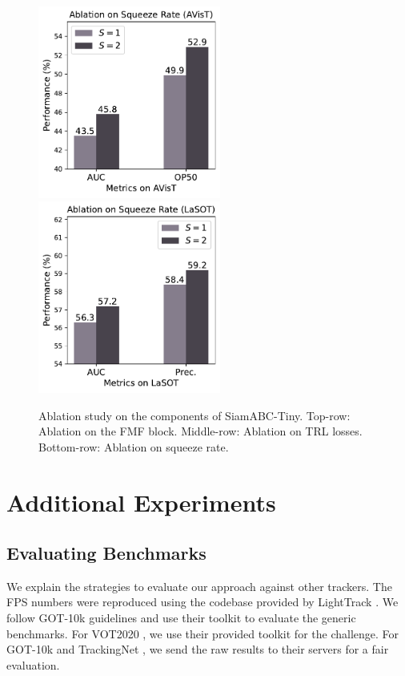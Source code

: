 \begin{figure}[t]
	 \includegraphics[width=6cm]{figures/abl_sr_avist.pdf}
	 \includegraphics[width=6cm]{figures/abl_sr_lasot.pdf}
	 \vspace{-4mm}
	 \caption{Ablation study on the components of SiamABC-Tiny. Top-row: Ablation on the FMF block. Middle-row: Ablation on TRL losses. Bottom-row: Ablation on squeeze rate.}
	 \label{fig:all_ablation}
	 \vspace{-5mm}
   \end{figure}


   \section{Additional Experiments}


\subsection{Evaluating Benchmarks}
We explain the strategies to evaluate our approach against other trackers. The FPS numbers were reproduced using the codebase provided by LightTrack \cite{yan2021lighttrack}. We follow GOT-10k\cite{Huang2021} guidelines and use their toolkit \cite{githubGitHubGot10ktoolkit} to evaluate the generic benchmarks. For VOT2020 \cite{kristan2020eighth}, we use their provided toolkit for the challenge. For GOT-10k\cite{Huang2021} and TrackingNet \cite{muller2018trackingnet}, we send the raw results to their servers for a fair evaluation. 

